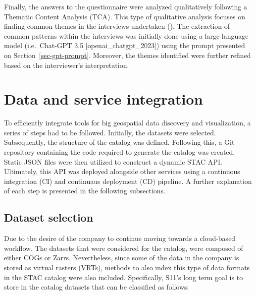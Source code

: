 \documentclass[
  oneside,
  open=any]{scrbook}
\begin{document}
Finally, the answers to the questionnaire were analyzed qualitatively
following a Thematic Content Analysis (TCA). This type of qualitative
analysis focuses on finding common themes in the interviews undertaken
(). The extraction
of common patterns within the interviews was initially done using a
large language model (i.e.~Chat-GPT 3.5 {[}openai\_chatgpt\_2023{]})
using the prompt presented on Section~\ref{sec-gpt-prompt}. Moreover,
the themes identified were further refined based on the interviewer's
interpretation.

\section{Data and service
integration}\label{data-and-service-integration}

To efficiently integrate tools for big geospatial data discovery and
visualization, a series of steps had to be followed. Initially, the
datasets were selected. Subsequently, the structure of the catalog was
defined. Following this, a Git repository containing the code required
to generate the catalog was created. Static JSON files were then
utilized to construct a dynamic STAC API. Ultimately, this API was
deployed alongside other services using a continuous integration (CI)
and continuaus deployment (CD) pipeline. A further explanation of each
step is presented in the following subsections.

\subsection{Dataset selection}\label{dataset-selection}

Due to the desire of the company to continue moving towards a
cloud-based workflow. The datasets that were considered for the catalog,
were composed of either COGs or Zarrs. Nevertheless, since some of the
data in the company is stored as virtual rasters (VRTs), methods to also
index this type of data formats in the STAC catalog were also included.
Specifically, S11's long term goal is to store in the catalog datasets
that can be classified as follows:
\end{document}
